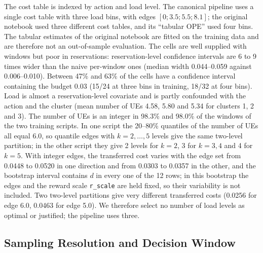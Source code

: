 The cost table is indexed by action and load level.
The canonical pipeline uses a single cost table with three load bins, with edges $[0;3.5;5.5;8.1]$; the original notebook used three different cost tables, and its ``tabular OPE'' used four bins.%
The tabular estimates of the original notebook are fitted on the training data and are therefore not an out-of-sample evaluation.%
The cells are well supplied with windows but poor in reservations: reservation-level confidence intervals are 6 to 9 times wider than the naive per-window ones (median width 0.044--0.059 against 0.006--0.010).%
Between 47\% and 63\% of the cells have a confidence interval containing the budget 0.03 (15/24 at three bins in training, 18/32 at four bins).%
Load is almost a reservation-level covariate and is partly confounded with the action and the cluster (mean number of UEs 4.58, 5.80 and 5.34 for clusters 1, 2 and 3).%
The number of UEs is an integer in 98.3\% and 98.0\% of the windows of the two training scripts.%
In one script the 20--80\% quantiles of the number of UEs all equal 6.0, so quantile edges with $k=2,\dots,5$ levels give the same two-level partition; in the other script they give 2 levels for $k=2$, 3 for $k=3,4$ and 4 for $k=5$.%
With integer edges, the transferred cost varies with the edge set from 0.0448 to 0.0520 in one direction and from 0.0303 to 0.0357 in the other, and the bootstrap interval contains $d$ in every one of the 12 rows; in this bootstrap the edges and the reward scale \texttt{r\_scale} are held fixed, so their variability is not included.%
Two two-level partitions give very different transferred costs (0.0256 for edge 6.0, 0.0463 for edge 5.0).%
We therefore select no number of load levels as optimal or justified; the pipeline uses three.%

\subsection{Sampling Resolution and Decision Window}
\label{sec:sampling}

